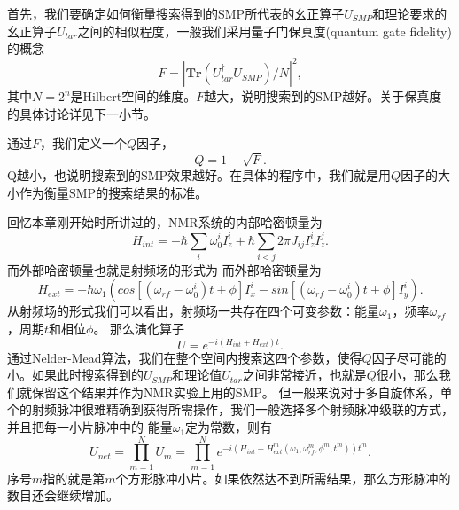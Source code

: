 首先，我们要确定如何衡量搜索得到的SMP所代表的幺正算子$U_{SMP}$和理论要求的幺正算子$U_{tar}$之间的相似程度，一般我们采用量子门保真度(quantum gate fidelity)的概念
\begin{equation}\label{aaa}
F = |\textbf{Tr}(U_{tar}^{\dagger}U_{SMP})/N|^2,
\end{equation}
其中$N=2^n$是Hilbert空间的维度。$F$越大，说明搜索到的SMP越好。关于保真度的具体讨论详见下一小节。

通过$F$，我们定义一个$Q$因子，
\begin{equation}\label{aaa}
Q = 1-\sqrt{F}.
\end{equation}
Q越小，也说明搜索到的SMP效果越好。在具体的程序中，我们就是用$Q$因子的大小作为衡量SMP的搜索结果的标准。

回忆本章刚开始时所讲过的，NMR系统的内部哈密顿量为
\begin{equation}\label{aaa}
H_{int} =-\hbar\sum_{i}\omega_0^i I_z^i+ \hbar\sum_{i<j} 2\pi J_{ij}I_z^iI_z^j.
\end{equation}
而外部哈密顿量也就是射频场的形式为
而外部哈密顿量为
\begin{equation}\label{aaa}
H_{ext} =  -\hbar\omega_1(cos[(\omega_{rf}-\omega_0^i)t+\phi]I_x^i-sin[(\omega_{rf}-\omega_0^i)t+\phi]I_y^i).
\end{equation}
从射频场的形式我们可以看出，射频场一共存在四个可变参数：能量$\omega_1$，频率$\omega_{rf}$，周期$t$和相位$\phi$。
那么演化算子
\begin{equation}\label{aaa}
U = e^{-i(H_{int}+H_{ext})t}.
\end{equation}
通过Nelder-Mead算法\cite{smp4}，我们在整个空间内搜索这四个参数，使得$Q$因子尽可能的小。如果此时搜索得到的$U_{SMP}$和理论值$U_{tar}$之间非常接近，也就是$Q$很小，那么我们就保留这个结果并作为NMR实验上用的SMP。
但一般来说对于多自旋体系，单个的射频脉冲很难精确到获得所需操作，我们一般选择多个射频脉冲级联的方式，并且把每一小片脉冲中的
能量$\omega_1$定为常数，则有
\begin{equation}\label{aaa}
U_{net} = \prod_{m=1}^N U_m = \prod_{m=1}^N e^{-i(H_{int}+H_{ext}^m(\omega_1, \omega_{rf}^m, \phi^m, t^m))t^m}.
\end{equation}
序号$m$指的就是第$m$个方形脉冲小片。如果依然达不到所需结果，那么方形脉冲的数目还会继续增加。

